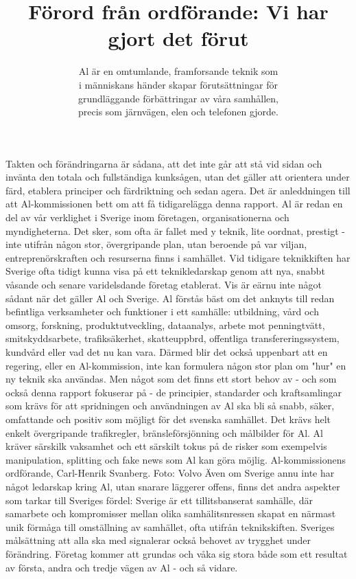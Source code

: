 \title{
Förord från ordförande: Vi har gjort det förut
}
\author{
Al är en omtumlande, framforsande teknik som \\ i människans händer skapar förutsättningar för \\ grundläggande förbättringar av våra samhållen, \\ precis som järnvägen, elen och telefonen gjorde.
}
Takten och förändringarna är sådana, att det inte går att stå vid sidan och invänta den totala och fullständiga kunksågen, utan det gäller att orientera under färd, etablera principer och färdriktning och sedan agera. Det är anleddningen till att Al-kommissionen bett om att få tidigarelägga denna rapport.
Al är redan en del av vår verklighet i Sverige inom företagen, organisationerna och myndigheterna. Det sker, som ofta är fallet med y teknik, lite oordnat, prestigt - inte utifrån någon stor, övergripande plan, utan beroende på var viljan, entreprenörskraften och resurserna finns i samhället. Vid tidigare teknikkiften har Sverige ofta tidigt kunna visa på ett teknikledarskap genom att nya, snabbt våsande och senare varidelsdande företag etablerat. Vis är eärnu inte något sådant när det gäller Al och Sverige.
Al förstås bäst om det anknyts till redan befintliga verksamheter och funktioner i ett samhälle: utbildning, vård och omsorg, forskning, produktutveckling, dataanalys, arbete mot penningtvätt, smitskyddsarbete, trafiksäkerhet, skatteuppbrd, offentliga transfereringssystem, kundvård eller vad det nu kan vara.
Därmed blir det också uppenbart att en regering, eller en Al-kommission, inte kan formulera någon stor plan om "hur" en ny teknik ska användas. Men något som det finns ett stort behov av - och som också denna rapport fokuserar på - de principier, standarder och kraftsamlingar som krävs för att spridningen och användningen av Al ska bli så snabb, säker, omfattande och positiv som möjligt för det svenska samhället. Det krävs helt enkelt övergripande trafikregler, bränsleförsjönning och målbilder för Al. Al kräver särskilk vaksamhet och ett särskilt tokus på de risker som exempelvis manipulation, splitting och fake news som Al kan göra möjlig.
Al-kommissionens ordförande, Carl-Henrik Svanberg. Foto: Volvo
Även om Sverige annu inte har något ledarskap kring Al, utan snarare läggerer offens, finns det andra aspekter som tarkar till Sveriges fördel: Sverige är ett tillitsbanserat samhälle, där samarbete och kompromisser mellan olika samhälitsnressen skapat en närmast unik förmåga till omställning av samhället, ofta utifrån teknikskiften. Sveriges målsättning att alla ska med signalerar också behovet av trygghet under förändring. Företag kommer att grundas och våka sig stora både som ett resultat av första, andra och tredje vägen av Al - och så vidare.
